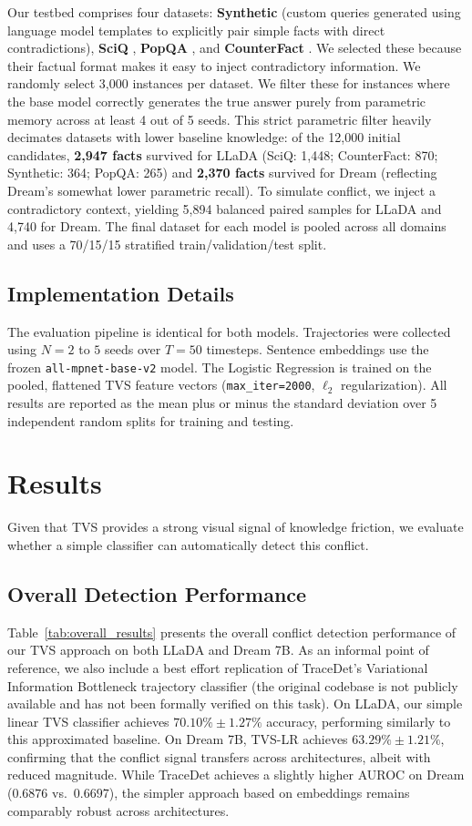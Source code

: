 \documentclass[11pt]{article}
\begin{document}
Our testbed comprises four datasets: \textbf{Synthetic} (custom queries generated using language model templates to explicitly pair simple facts with direct contradictions), \textbf{SciQ} \citep{welbl2017crowdsourcing}, \textbf{PopQA} \citep{mallen2023entity}, and \textbf{CounterFact} \citep{meng2022locating}. We selected these because their factual format makes it easy to inject contradictory information. We randomly select 3,000 instances per dataset. We filter these for instances where the base model correctly generates the true answer purely from parametric memory across at least 4 out of 5 seeds. This strict parametric filter heavily decimates datasets with lower baseline knowledge: of the 12,000 initial candidates, \textbf{2,947 facts} survived for LLaDA (SciQ: 1,448; CounterFact: 870; Synthetic: 364; PopQA: 265) and \textbf{2,370 facts} survived for Dream (reflecting Dream's somewhat lower parametric recall). To simulate conflict, we inject a contradictory context, yielding 5,894 balanced paired samples for LLaDA and 4,740 for Dream. The final dataset for each model is pooled across all domains and uses a 70/15/15 stratified train/validation/test split.

\subsection{Implementation Details}
The evaluation pipeline is identical for both models. Trajectories were collected using $N=2$ to $5$ seeds over $T=50$ timesteps. Sentence embeddings use the frozen \texttt{all-mpnet-base-v2} model. The Logistic Regression is trained on the pooled, flattened TVS feature vectors (\texttt{max\_iter=2000}, $\ell_2$ regularization). All results are reported as the mean plus or minus the standard deviation over 5 independent random splits for training and testing.

\section{Results}
Given that TVS provides a strong visual signal of knowledge friction, we evaluate whether a simple classifier can automatically detect this conflict.

\subsection{Overall Detection Performance}
Table~\ref{tab:overall_results} presents the overall conflict detection performance of our TVS approach on both LLaDA and Dream 7B. As an informal point of reference, we also include a best effort replication of TraceDet's Variational Information Bottleneck trajectory classifier (the original codebase is not publicly available and has not been formally verified on this task). On LLaDA, our simple linear TVS classifier achieves $70.10\% \pm 1.27\%$ accuracy, performing similarly to this approximated baseline. On Dream 7B, TVS-LR achieves $63.29\% \pm 1.21\%$, confirming that the conflict signal transfers across architectures, albeit with reduced magnitude. While TraceDet achieves a slightly higher AUROC on Dream ($0.6876$ vs.\ $0.6697$), the simpler approach based on embeddings remains comparably robust across architectures.
\end{document}
